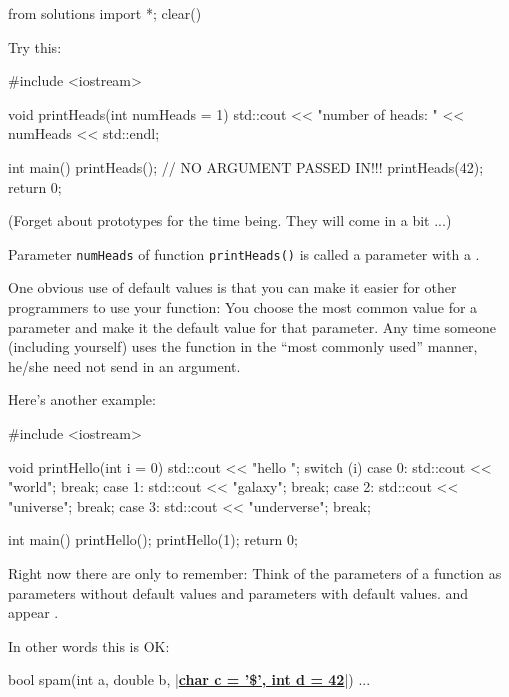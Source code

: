 \begin{python0}
from solutions import *; clear()
\end{python0}

Try this:

\begin{consolethree}[escapeinside=||]
#include <iostream>

void printHeads(int numHeads = 1)
{
    std::cout << "number of heads: " << numHeads
              << std::endl;
}

int main()
{
    printHeads(); // NO ARGUMENT PASSED IN!!!
    printHeads(42);
    return 0;
}
\end{consolethree}

(Forget about prototypes for the time being. They will come in a bit ...)

Parameter \texttt{numHeads} of function \texttt{printHeads()} is called a parameter with a .

One obvious use of default values is that you can make it easier for other programmers to use your function: You choose the most common value for a parameter and make it the default value for that parameter. Any time someone (including yourself) uses the function in the ``most commonly used'' manner, he/she need not send in an argument.

Here's another example:

\begin{consolethree}[escapeinside=||]
#include <iostream>

void printHello(int i = 0)
{
    std::cout << "hello ";
    switch (i)
    {
        case 0: std::cout << "world\n"; break;
        case 1: std::cout << "galaxy\n"; break;
        case 2: std::cout << "universe\n"; break;
        case 3: std::cout << "underverse\n"; break;
    }
}

int main()
{
    printHello();
    printHello(1);
    return 0;
}
\end{consolethree}

Right now there are only  to remember: Think of the parameters of a function as parameters without default values and parameters with default values.  and appear .

In other words this is OK:

\begin{consolethree}[escapeinside=||]
bool spam(int a, double b, |\textbf{\underline{char c = '\$', int d = 42}}|)
{
    ...
}
\end{consolethree}


